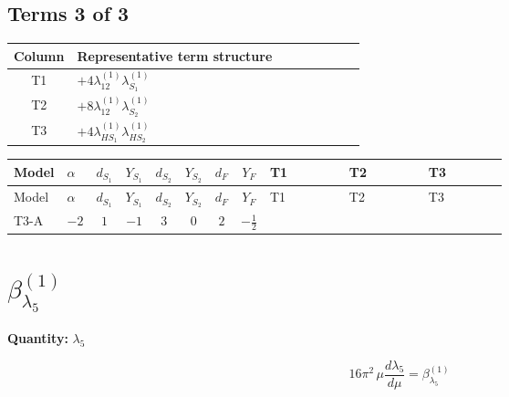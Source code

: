 \documentclass[8pt]{article}
\begin{document}
\begin{landscape}
\subsection*{Terms 3 of 3}
\begin{center}
\begin{tabular}{@{}c >{\raggedright\arraybackslash}p{0.82\linewidth}@{}}
\toprule
Column & Representative term structure \\
\midrule
T1 & \(\displaystyle +4 {\lambda_{12}^{(1)}} {\lambda_{S_1}^{(1)}}\) \\
\midrule
T2 & \(\displaystyle +8 {\lambda_{12}^{(1)}} {\lambda_{S_2}^{(1)}}\) \\
\midrule
T3 & \(\displaystyle +4 {\lambda_{HS_1}^{(1)}} {\lambda_{HS_2}^{(1)}}\) \\
\midrule
\bottomrule
\end{tabular}
\end{center}
\smallskip
\tiny
\begin{longtable}{@{}llcccccc >{\raggedright\arraybackslash}p{0.21\linewidth} >{\raggedright\arraybackslash}p{0.21\linewidth} >{\raggedright\arraybackslash}p{0.21\linewidth}@{}}
\toprule
Model & $\alpha$ & $d_{S_1}$ & $Y_{S_1}$ & $d_{S_2}$ & $Y_{S_2}$ & $d_F$ & $Y_F$ & T1 & T2 & T3 \\
\midrule
\endfirsthead
\toprule
Model & $\alpha$ & $d_{S_1}$ & $Y_{S_1}$ & $d_{S_2}$ & $Y_{S_2}$ & $d_F$ & $Y_F$ & T1 & T2 & T3 \\
\midrule
\endhead
T3-A & $-2$ & $1$ & $-1$ & $3$ & $0$ & $2$ & $-\frac{1}{2}$ & \scriptsize\adjustbox{max width=\linewidth}{$\begin{gathered} +4 {\lambda_{12}^{(1)}} {\lambda_{S_1}^{(1)}}\end{gathered}$} & \scriptsize\adjustbox{max width=\linewidth}{$\begin{gathered} +8 {\lambda_{12}^{(1)}} {\lambda_{S_2}^{(1)}}\end{gathered}$} & \scriptsize\adjustbox{max width=\linewidth}{$\begin{gathered} +4 {\lambda_{HS_1}^{(1)}} {\lambda_{HS_2}^{(1)}}\end{gathered}$} \\
\midrule
\bottomrule
\end{longtable}
\clearpage
\section*{$\beta_{\lambda_5}^{(1)}$}
\noindent\textbf{Quantity: }$\lambda_5$\par\smallskip
\[16\pi^2\,\mu\frac{d \lambda_5}{d\mu}=\beta_{\lambda_5}^{(1)}\]

\end{landscape}
\end{document}
